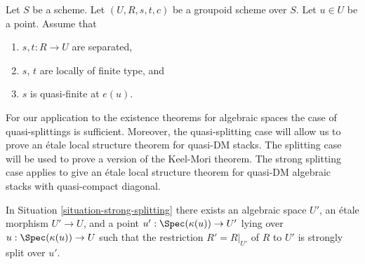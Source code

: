 \begin{situation}
\label{situation-quasi-splitting}
Let $S$ be a scheme.
Let $(U, R, s, t, c)$ be a groupoid scheme over $S$.
Let $u \in U$ be a point. Assume that
\begin{enumerate}
\item $s, t : R \to U$ are separated,
\item $s$, $t$ are locally of finite type, and
\item $s$ is quasi-finite at $e(u)$.
\end{enumerate}
\end{situation}

\noindent
For our application to the existence theorems for algebraic spaces
the case of quasi-splittings is sufficient. Moreover, the quasi-splitting
case will allow us to prove an \'etale local structure theorem for
quasi-DM stacks. The splitting case will be used to prove a version
of the Keel-Mori theorem. The strong splitting case applies to give
an \'etale local structure theorem for quasi-DM algebraic stacks
with quasi-compact diagonal.

\begin{lemma}
\label{lemma-strong-splitting}
In Situation \ref{situation-strong-splitting}
there exists an algebraic space $U'$, an \'etale morphism
$U' \to U$, and a point $u' : \Spec(\kappa(u)) \to U'$
lying over $u : \Spec(\kappa(u)) \to U$
such that the restriction $R' = R|_{U'}$ of $R$ to $U'$
is strongly split over $u'$.
\end{lemma}

